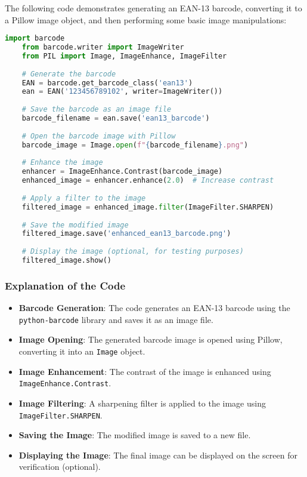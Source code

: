 The following code demonstrates generating an EAN-13 barcode, converting it to a Pillow image object, and then performing some basic image manipulations:
\begin{lstlisting}[language=Python]
	import barcode
	from barcode.writer import ImageWriter
	from PIL import Image, ImageEnhance, ImageFilter
	
	# Generate the barcode
	EAN = barcode.get_barcode_class('ean13')
	ean = EAN('123456789102', writer=ImageWriter())
	
	# Save the barcode as an image file
	barcode_filename = ean.save('ean13_barcode')
	
	# Open the barcode image with Pillow
	barcode_image = Image.open(f"{barcode_filename}.png")
	
	# Enhance the image
	enhancer = ImageEnhance.Contrast(barcode_image)
	enhanced_image = enhancer.enhance(2.0)  # Increase contrast
	
	# Apply a filter to the image
	filtered_image = enhanced_image.filter(ImageFilter.SHARPEN)
	
	# Save the modified image
	filtered_image.save('enhanced_ean13_barcode.png')
	
	# Display the image (optional, for testing purposes)
	filtered_image.show()
\end{lstlisting}

\subsubsection{Explanation of the Code}

\begin{itemize}
	\item \textbf{Barcode Generation}: The code generates an EAN-13 barcode using the \texttt{python-barcode} library and saves it as an image file.
	\item \textbf{Image Opening}: The generated barcode image is opened using Pillow, converting it into an \texttt{Image} object.
	\item \textbf{Image Enhancement}: The contrast of the image is enhanced using \texttt{ImageEnhance.Contrast}.
	\item \textbf{Image Filtering}: A sharpening filter is applied to the image using \texttt{ImageFilter.SHARPEN}.
	\item \textbf{Saving the Image}: The modified image is saved to a new file.
	\item \textbf{Displaying the Image}: The final image can be displayed on the screen for verification (optional).
\end{itemize}


